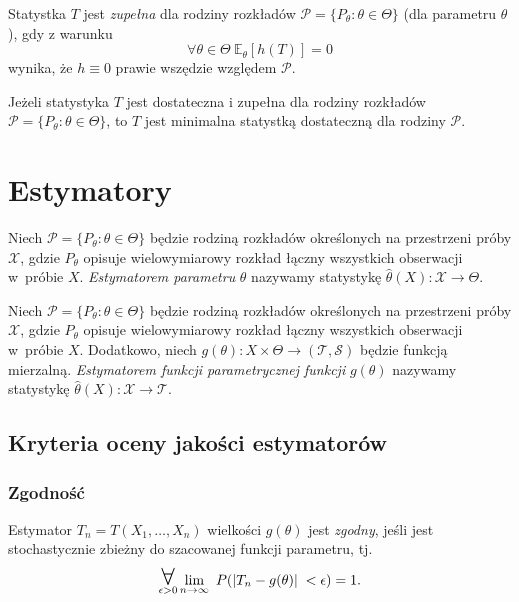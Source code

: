 \begin{df}
	 Statystka $T$ jest \textit{zupełna} dla rodziny rozkładów $\mathcal{P}=\{P_\theta : \theta \in \Theta\}$ (dla parametru $\theta$), gdy z warunku
	 \begin{equation*}
	 	\forall \theta \in \Theta \  \mathbb{E}_{\theta}[h(T)] = 0
	 \end{equation*}
	 wynika, że $h \equiv 0 $ prawie wszędzie względem $\mathcal{P}$.
\end{df}

\begin{tw}
	Jeżeli statystyka $T$ jest dostateczna i zupełna dla rodziny rozkładów $\mathcal{P}=\{P_\theta : \theta \in \Theta\}$, to $T$ jest minimalna statystką dostateczną dla rodziny $\mathcal{P}$.
\end{tw}

\section{Estymatory}
	\begin{df}
		Niech $\mathcal{P}=\{P_\theta : \theta \in \Theta\}$ będzie rodziną rozkładów określonych na przestrzeni próby $\mathcal{X}$, gdzie $P_\theta$ opisuje wielowymiarowy rozkład łączny wszystkich obserwacji w~próbie $X$. \textit{Estymatorem parametru} $\theta$ nazywamy statystykę $\hat{\theta}(X):\mathcal{X} \to \Theta$.
	\end{df}
	
	\begin{df}
		Niech $\mathcal{P}=\{P_\theta : \theta \in \Theta\}$ będzie rodziną rozkładów określonych na przestrzeni próby $\mathcal{X}$, gdzie $P_\theta$ opisuje wielowymiarowy rozkład łączny wszystkich obserwacji w~próbie $X$. Dodatkowo, niech $g(\theta): X \times \Theta \to (\mathcal{T}, \mathcal{S})$ będzie funkcją mierzalną.  \textit{Estymatorem funkcji parametrycznej funkcji} $g(\theta)$ nazywamy statystykę $\hat{\theta}(X):\mathcal{X} \to \mathcal{T}$.
	\end{df}
	
\subsection{Kryteria oceny jakości estymatorów}
\subsubsection{Zgodność}
	
	\begin{df}
			Estymator $T_n = T(X_1, \ldots, X_n)$ wielkości $g(\theta)$ jest \textit{zgodny}, jeśli jest stochastycznie zbieżny do szacowanej funkcji parametru, tj.
			\begin{equation*}				
			\displaystyle\mathop{\mathlarger{\mathlarger{\mathlarger{\forall}}}}_{\epsilon > 0} \lim_{n \to \infty} \ 
			P ( | T_n- g(\theta)|\; < \epsilon ) = 1.
			\end{equation*}
	\end{df}


